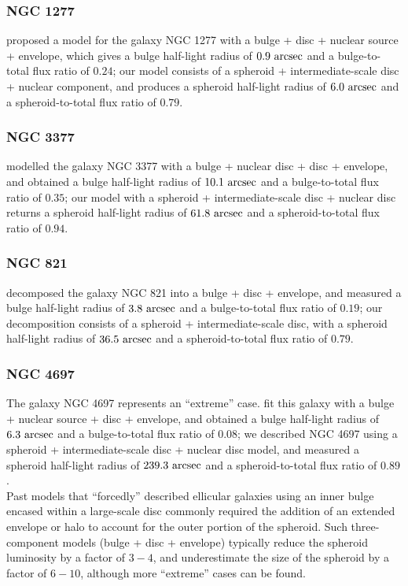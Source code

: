 \documentclass[useAMS,usenatbib,article]{mnras}
\begin{document}
\subsubsection{NGC 1277}
\cite{vandenbosch2012} proposed a model for the galaxy NGC 1277 with a bulge + disc + nuclear source + envelope, 
which gives a bulge half-light radius of $0.9~\rm arcsec$ and a bulge-to-total flux ratio of $0.24$; 
our model consists of a spheroid + intermediate-scale disc + nuclear component, 
and produces a spheroid half-light radius of $6.0~\rm arcsec$ and a spheroid-to-total flux ratio of $0.79$. 

\subsubsection{NGC 3377}
\cite{lasker2014data} modelled the galaxy NGC 3377 with a bulge + nuclear disc + disc + envelope, 
and obtained a bulge half-light radius of $10.1~\rm arcsec$ and a bulge-to-total flux ratio of $0.35$; 
our model with a spheroid + intermediate-scale disc + nuclear disc 
returns a spheroid half-light radius of $61.8~\rm arcsec$ and a spheroid-to-total flux ratio of $0.94$. 

\subsubsection{NGC 821}
\cite{lasker2014data} decomposed the galaxy NGC 821 into a bulge + disc + envelope, 
and measured a bulge half-light radius of $3.8~\rm arcsec$ and a bulge-to-total flux ratio of $0.19$; 
our decomposition consists of a spheroid + intermediate-scale disc, 
with a spheroid half-light radius of $36.5~\rm arcsec$ and a spheroid-to-total flux ratio of $0.79$. 

\subsubsection{NGC 4697}
The galaxy NGC 4697 represents an ``extreme'' case. 
\cite{lasker2014data} fit this galaxy with a bulge + nuclear source + disc + envelope, 
and obtained a bulge half-light radius of $6.3~\rm arcsec$ and a bulge-to-total flux ratio of $0.08$; 
we described NGC 4697 using a spheroid + intermediate-scale disc + nuclear disc model, 
and measured a spheroid half-light radius of $239.3~\rm arcsec$ and a spheroid-to-total flux ratio of $0.89$. \\

Past models that ``forcedly'' described ellicular galaxies using an inner bulge 
encased within a large-scale disc 
commonly required the addition of an extended envelope or halo to account for the outer portion of the spheroid. 
Such three-component models (bulge + disc + envelope) typically reduce the spheroid luminosity by a factor of $3-4$, 
and underestimate the size of the spheroid by a factor of $6-10$, 
although more ``extreme'' cases can be found. 
\end{document}
